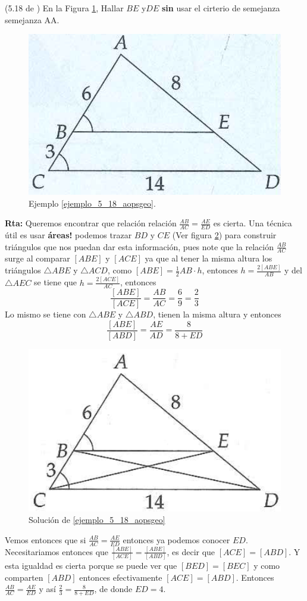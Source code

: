 \begin{ejemplo}{(5.18 de \cite{Aops_Geometria})}
	\label{ejemplo_5_18_aopsgeo}En la Figura \ref{5_18_aopsgeo}, Hallar $BE$ y$DE$ \textbf{sin} usar el cirterio de semejanza semejanza AA.
	\begin{figure}[H]
		\centering
		\includegraphics[width=0.5\linewidth]{Geometria/imgs/5_18_aopsgeo}
		\caption{Ejemplo \ref{ejemplo_5_18_aopsgeo}.}
		\label{5_18_aopsgeo}
	\end{figure}
	\textbf{Rta: }Queremos encontrar que relación relación $\frac{AB}{AC} = \frac{AE}{ED}$ es cierta. Una técnica útil es usar \textbf{áreas!} podemos trazar $BD$ y $CE$ (Ver figura \ref{5_18_aopsgeo_sol}) para construir triángulos que nos puedan dar esta información, pues note que la relación $\frac{AB}{AC}$ surge al comparar $[ABE]$ y $[ACE]$ ya que al tener la misma altura los triángulos $\triangle ABE$ y $\triangle ACD$, como $[ABE]=\frac{1}{2}AB\cdot h$, entonces $h=\frac{2[ABE]}{AB}$ y del $\triangle AEC$ se tiene que $h=\frac{2[ACE]}{AC}$, entonces 
	\[
		\frac{[ABE]}{[ACE]} = \frac{AB}{AC} =\frac{6}{9} = \frac{2}{3}
	\]
	Lo mismo se tiene con $\triangle ABE$ y $\triangle ABD$, tienen la misma altura y entonces 
	\[
	\frac{[ABE]}{[ABD]} = \frac{AE}{AD} =\frac{8}{8+ED} 
	\]
	\begin{figure}[H]
		\centering
		\includegraphics[width=0.5\linewidth]{Geometria/imgs/5_18_aopsgeo_sol}
		\caption{Solución de \ref{ejemplo_5_18_aopsgeo}}
		\label{5_18_aopsgeo_sol}
	\end{figure}
	Vemos entonces que si $\frac{AB}{AC} = \frac{AE}{ED}$ entonces ya podemos conocer $ED$. Necesitariamos entonces que $\frac{[ABE]}{[ACE]}=\frac{[ABE]}{[ABD]}$, es decir que $[ACE]=[ABD]$. Y esta igualdad es cierta porque se puede ver que $[BED]=[BEC]$ y como comparten $[ABD]$ entonces efectivamente $[ACE]=[ABD]$. Entonces $\frac{AB}{AC} = \frac{AE}{ED}$ y así $\frac{2}{3}=\frac{8}{8+ED} $, de donde $ED=4$.


\end{ejemplo}
